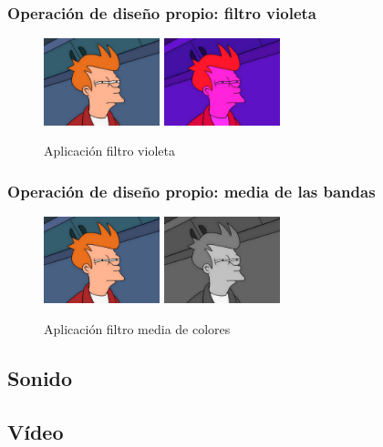 \subsubsection{Operación de diseño propio: filtro violeta}
\vskip0.3cm
\begin{figure}[H]
 \centering
  \includegraphics[width=0.3\textwidth]{imagenes/Fry.jpg}
  \includegraphics[width=0.3\textwidth]{imagenes/fryVioleta.jpg}
 \caption{Aplicación filtro violeta}
 \label{diseño}
 \end{figure}
\subsubsection{Operación de diseño propio: media de las bandas}
\vskip0.3cm
\begin{figure}[H]
 \centering
  \includegraphics[width=0.3\textwidth]{imagenes/Fry.jpg}
  \includegraphics[width=0.3\textwidth]{imagenes/fryMediaBandas.jpg}
 \caption{Aplicación filtro media de colores}
 \label{diseño}
 \end{figure}
\subsection{Sonido}
\subsection{Vídeo}




